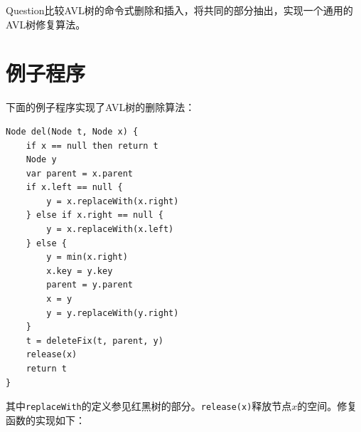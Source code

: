 \documentclass[b5paper]{ctexart}
\begin{document}
\begin{Exercise}
Question{比较AVL树的命令式删除和插入，将共同的部分抽出，实现一个通用的AVL树修复算法。}
\end{Exercise}

\section{例子程序}

下面的例子程序实现了AVL树的删除算法：

\begin{lstlisting}[language = Bourbaki]
Node del(Node t, Node x) {
    if x == null then return t
    Node y
    var parent = x.parent
    if x.left == null {
        y = x.replaceWith(x.right)
    } else if x.right == null {
        y = x.replaceWith(x.left)
    } else {
        y = min(x.right)
        x.key = y.key
        parent = y.parent
        x = y
        y = y.replaceWith(y.right)
    }
    t = deleteFix(t, parent, y)
    release(x)
    return t
}
\end{lstlisting}

其中\texttt{replaceWith}的定义参见红黑树的部分。\texttt{release(x)}释放节点$x$的空间。修复函数的实现如下：
\end{document}
